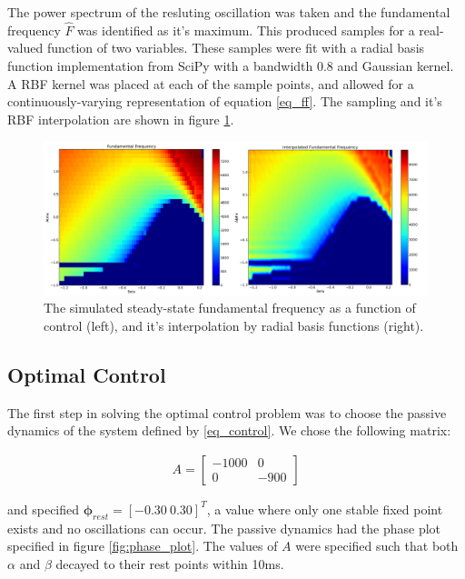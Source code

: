 \documentclass{article} %
\begin{document}
The power spectrum of the resluting oscillation was
taken and the fundamental frequency $\hat{F}$ was identified as it's maximum. This
produced samples for a real-valued function of two variables. These samples were fit with
a radial basis function implementation from SciPy with a bandwidth 0.8 and Gaussian kernel.
A RBF kernel was placed at each of the sample points, and allowed for a continuously-varying
representation of equation \eqref{eq_ff}. The sampling and it's RBF interpolation are shown
in figure \ref{fig:ff}.

\begin{figure}[h]
\centering
\includegraphics[width=1.0\textwidth]{images/ff_both.png}
\caption{The simulated steady-state fundamental frequency as a function of control (left), and it's interpolation by radial basis functions (right).}
\label{fig:ff}
\end{figure}

\subsection{Optimal Control}

The first step in solving the optimal control problem was to choose the passive dynamics
of the system defined by \eqref{eq_control}. We chose the following matrix:

\begin{align*}
A = \left[ \begin{array}{cc} -1000 & 0 \\ 0 & -900 \end{array} \right]
\end{align*}

and specified $\bm{\phi}_{rest} = \left[ -0.30 ~ 0.30 \right] ^T$, a value where
only one stable fixed point exists and no oscillations can occur. The passive
dynamics had the phase plot specified in figure \ref{fig:phase_plot}. The values
of $A$ were specified such that both $\alpha$ and $\beta$ decayed to their rest
points within 10ms.
\end{document}
